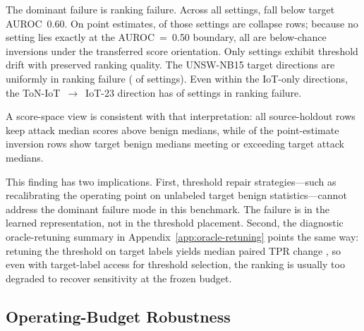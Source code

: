 \documentclass[preprint,12pt]{elsarticle}
\begin{document}


The dominant failure is ranking failure. Across all \NaturalSettingCount{} settings, \FullRankingFailureCount{} fall below target AUROC~0.60. On point estimates, \FullCollapseCount{} of those settings are collapse rows; because no setting lies exactly at the AUROC~=~0.50 boundary, all \FullCollapseCount{} are below-chance inversions under the transferred score orientation. Only \ThresholdDriftCount{} settings exhibit threshold drift with preserved ranking quality. The UNSW-NB15 target directions are uniformly in ranking failure (\UnswTargetRankingFailureCount{} of \UnswTargetSettingCount{} settings). Even within the IoT-only directions, the ToN-IoT~$\to$~IoT-23 direction has \TonToIotRankingFailureCount{} of \ModelCount{} settings in ranking failure.

A score-space view is consistent with that interpretation: all \FullSourcePositiveMedianGapCount{} source-holdout rows keep attack median scores above benign medians, while \FullInversionMedianCrossoverCount{} of the \FullInversionCount{} point-estimate inversion rows show target benign medians meeting or exceeding target attack medians.

This finding has two implications. First, threshold repair strategies---such as recalibrating the operating point on unlabeled target benign statistics---cannot address the dominant failure mode in this benchmark. The failure is in the learned representation, not in the threshold placement. Second, the diagnostic oracle-retuning summary in Appendix~\ref{app:oracle-retuning} points the same way: retuning the threshold on target labels yields median paired TPR change \AllNaturalMedianRetunedTprGain{}, so even with target-label access for threshold selection, the ranking is usually too degraded to recover sensitivity at the frozen budget.

\subsection{Operating-Budget Robustness}
\label{sec:budget-robustness}


\end{document}
